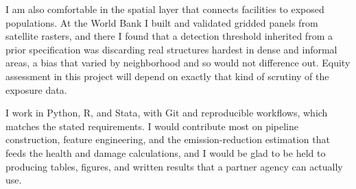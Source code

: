 I am also comfortable in the spatial layer that connects facilities to exposed populations. At the World Bank I built and validated gridded panels from satellite rasters, and there I found that a detection threshold inherited from a prior specification was discarding real structures hardest in dense and informal areas, a bias that varied by neighborhood and so would not difference out. Equity assessment in this project will depend on exactly that kind of scrutiny of the exposure data.

I work in Python, R, and Stata, with Git and reproducible workflows, which matches the stated requirements. I would contribute most on pipeline construction, feature engineering, and the emission-reduction estimation that feeds the health and damage calculations, and I would be glad to be held to producing tables, figures, and written results that a partner agency can actually use.


